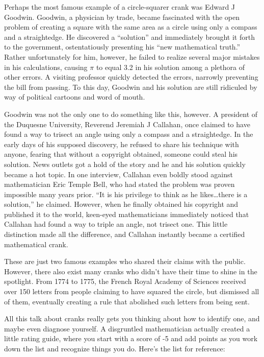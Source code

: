 \documentclass{article}
\begin{document}
Perhaps the most famous example of a circle-squarer crank was Edward J Goodwin. Goodwin, a physician by trade, became fascinated with the open problem of creating a square with the same area as a circle using only a compass and a straightedge. He discovered a ``solution'' and immediately brought it forth to the government, ostentatiously presenting his ``new mathematical truth.'' Rather unfortunately for him, however, he failed to realize several major mistakes in his calculations, causing $\pi$ to equal 3.2 in his solution among a plethora of other errors. A visiting professor quickly detected the errors, narrowly preventing the bill from passing. To this day, Goodwin and his solution are still ridiculed by way of political cartoons and word of mouth.

Goodwin was not the only one to do something like this, however. A president of the Duquesne University, Reverend Jeremiah J Callahan, once claimed to have found a way to trisect an angle using only a compass and a straightedge. In the early days of his supposed discovery, he refused to share his technique with anyone, fearing that without a copyright obtained, someone could steal his solution. News outlets got a hold of the story and he and his solution quickly became a hot topic. In one interview, Callahan even boldly stood against mathematician Eric Temple Bell, who had stated the problem was proven impossible many years prior. ``It is his privilege to think as he likes…there is a solution,'' he claimed. However, when he finally obtained his copyright and published it to the world, keen-eyed mathematicians immediately noticed that Callahan had found a way to triple an angle, not trisect one. This little distinction made all the difference, and Callahan instantly became a certified mathematical crank.

These are just two famous examples who shared their claims with the public. However, there also exist many cranks who didn’t have their time to shine in the spotlight. From 1774 to 1775, the French Royal Academy of Sciences received over 150 letters from people claiming to have squared the circle, but dismissed all of them, eventually creating a rule that abolished such letters from being sent. 

All this talk about cranks really gets you thinking about how to identify one, and maybe even diagnose yourself. A disgruntled mathematician actually created a little rating guide, where you start with a score of -5 and add points as you work down the list and recognize things you do. Here’s the list for reference:
\end{document}
